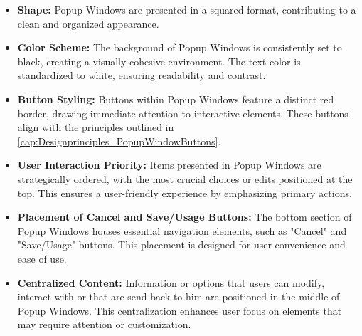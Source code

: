 \documentclass[]{scrreprt}
\begin{document}
\begin{itemize}
    \item \textbf{Shape:} Popup Windows are presented in a squared format, contributing to a clean and organized appearance.
    
    \item \textbf{Color Scheme:} The background of Popup Windows is consistently set to black, creating a visually cohesive environment. The text color is standardized to white, ensuring readability and contrast.
    
    \item \textbf{Button Styling:} Buttons within Popup Windows feature a distinct red border, drawing immediate attention to interactive elements. These buttons align with the principles outlined in \ref{cap:Designprinciples_PopupWindowButtons}.
    
    \item \textbf{User Interaction Priority:} Items presented in Popup Windows are strategically ordered, with the most crucial choices or edits positioned at the top. This ensures a user-friendly experience by emphasizing primary actions.
    
    \item \textbf{Placement of Cancel and Save/Usage Buttons:} The bottom section of Popup Windows houses essential navigation elements, such as "Cancel" and "Save/Usage" buttons. This placement is designed for user convenience and ease of use.
    
    \item \textbf{Centralized Content:} Information or options that users can modify, interact with or that are send back to him are positioned in the middle of Popup Windows. This centralization enhances user focus on elements that may require attention or customization.
\end{itemize}
\end{document}
